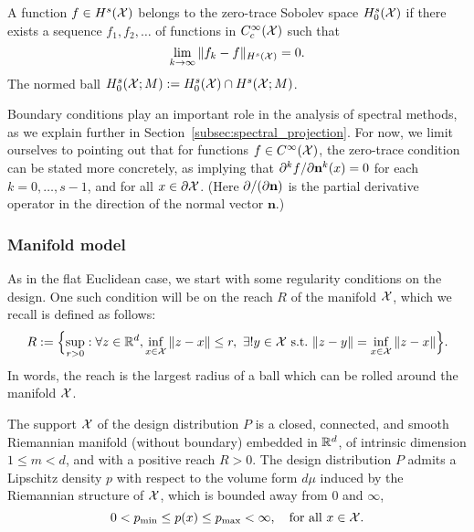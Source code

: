 \begin{definition}
	\label{def:zero_trace_sobolev_space}
	A function $f \in H^s(\mathcal{X})$ belongs to the zero-trace Sobolev space $H_0^s(\mathcal{X})$ if there exists a sequence $f_1,f_2,\ldots$ of functions in $C_c^{\infty}(\mathcal{X})$ such that
	\begin{equation*}
	\lim_{k \to \infty}\|f_k - f\|_{H^s(\mathcal{X})} = 0.
	\end{equation*}
	The normed ball $H_0^{s}(\mathcal{X};M) := H_0^{s}(\mathcal{X}) \cap H^{s}(\mathcal{X};M)$.
\end{definition}
Boundary conditions play an important role in the analysis of spectral methods, as we explain further in Section~\ref{subsec:spectral_projection}. For now, we limit ourselves to pointing out that for functions $f \in C^\infty(\mathcal{X})$, the zero-trace condition can be stated more concretely, as implying that $\partial^{k}f/\partial{\bf n}^k(x) = 0$ for each $k = 0,\ldots,s - 1$, and for all $x \in \partial\mathcal{X}$. (Here $\partial/(\partial {\bf n})$ is the partial derivative operator in the direction of the normal vector $\mathbf{n}$.)

\subsubsection{Manifold model}
As in the flat Euclidean case, we start with some regularity conditions on the design. One such condition will be on the reach $R$ of the manifold $\mathcal{X}$, which we recall is defined as follows:
\begin{equation*}
R := \Bigl\{\sup_{r > 0}: \forall z \in \mathbb{R}^d, \inf_{x \in \mathcal{X}} \|z - x\| \leq r, ~\exists! y \in \mathcal{X}~\mathrm{s.t.}~\|z - y\| = \inf_{x \in \mathcal{X}} \|z - x\|\Bigr\}.
\end{equation*}
In words, the reach is the largest radius of a ball which can be rolled around the manifold $\mathcal{X}$.
\begin{definition}
	\label{def:model_manifold}
	The support $\mathcal{X}$ of the design distribution $P$ is a closed, connected, and smooth Riemannian manifold (without boundary) embedded in $\mathbb{R}^d$, of intrinsic dimension $1 \leq m < d$, and with a positive reach $R > 0$. The design distribution $P$ admits a Lipschitz density $p$ with respect to the volume form $d\mu$ induced by the Riemannian structure of $\mathcal{X}$, which is bounded away from $0$ and $\infty$,
	\begin{equation*}
	0 < p_{\min} \leq p(x) \leq p_{\max} < \infty, \quad \textrm{for all $x \in \mathcal{X}$.}
	\end{equation*}
\end{definition}

